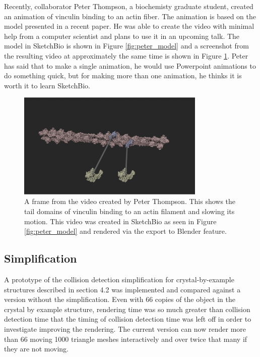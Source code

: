 \documentclass{article} %
\begin{document}
Recently, collaborator Peter Thompson, a biochemisty graduate student, created an animation of vinculin binding to an actin fiber.  The animation is based on the model presented in a recent paper.  He was able to create the video with minimal help from a computer scientist and plans to use it in an upcoming talk.  The model in SketchBio is shown in Figure \ref{fig:peter_model} and a screenshot from the resulting video at approximately the same time is shown in Figure \ref{fig:peter_video}.  Peter has said that to make a single animation, he would use Powerpoint animations to do something quick, but for making more than one animation, he thinks it is worth it to learn SketchBio.


\begin{figure}[h!]
\centering
\includegraphics[width=0.8\textwidth]{peter_video.png}
\caption{A frame from the video created by Peter Thompson.  This shows the tail domains of vinculin binding to an actin filament and slowing its motion.  This video was created in SketchBio as seen in Figure \ref{fig:peter_model} and rendered via the export to Blender feature.}
\label{fig:peter_video}
\end{figure}

\subsection{Simplification}
A prototype of the collision detection simplification for crystal-by-example structures described in section 4.2 was implemented and compared against a version without the simplification.  Even with 66 copies of the object in the crystal by example structure, rendering time was so much greater than collision detection time that the timing of collision detection time was left off in order to investigate improving the rendering.  The current version can now render more than 66 moving 1000 triangle meshes interactively and over twice that many if they are not moving.
\end{document}
